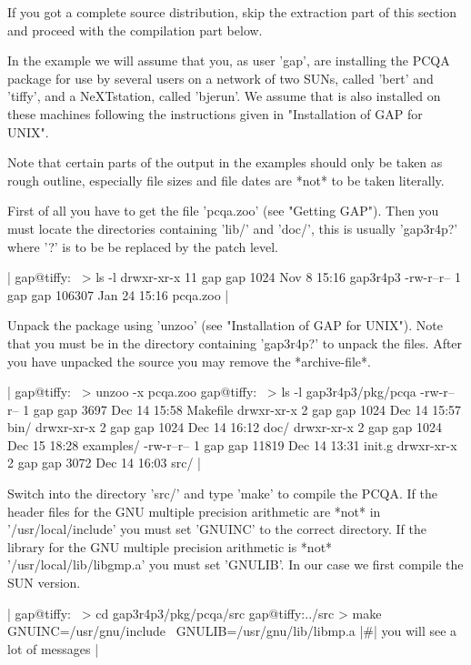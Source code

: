 If you  got a complete source distribution,  skip the  extraction part of
this section and proceed with the compilation part below.

In the example we will assume that you, as user 'gap', are installing the
PCQA  package for use by several  users on a network  of two SUNs, called
'bert' and  'tiffy', and a NeXTstation, called   'bjerun'. We assume that
{\GAP}  is also  installed on these   machines following the instructions
given in "Installation of GAP for UNIX".

Note that certain parts  of  the  output  in the examples should  only be
taken as rough outline, especially file sizes and file dates are *not* to
be taken literally.

First of all you  have to get the  file  'pcqa.zoo' (see "Getting  GAP").
Then you must locate the {\GAP} directories containing 'lib/' and 'doc/',
this is usually 'gap3r4p?' where  '?' is to be  be replaced by the  patch
level.

|    gap@tiffy:~ > ls -l
    drwxr-xr-x  11 gap    gap      1024 Nov  8 15:16 gap3r4p3
    -rw-r--r--   1 gap    gap    106307 Jan 24 15:16 pcqa.zoo |

Unpack the  package using 'unzoo' (see "Installation  of  GAP for UNIX").
Note that you  must be in the  directory containing 'gap3r4p?'  to unpack
the  files.   After  you have  unpacked  the source   you  may remove the
*archive-file*.

|    gap@tiffy:~ > unzoo -x pcqa.zoo
    gap@tiffy:~ > ls -l gap3r4p3/pkg/pcqa
    -rw-r--r--   1 gap    gap      3697 Dec 14 15:58 Makefile
    drwxr-xr-x   2 gap    gap      1024 Dec 14 15:57 bin/
    drwxr-xr-x   2 gap    gap      1024 Dec 14 16:12 doc/
    drwxr-xr-x   2 gap    gap      1024 Dec 15 18:28 examples/
    -rw-r--r--   1 gap    gap     11819 Dec 14 13:31 init.g
    drwxr-xr-x   2 gap    gap      3072 Dec 14 16:03 src/ |

Switch into the directory 'src/' and type 'make' to compile the PCQA.  If
the header files for  the GNU multiple  precision arithmetic are *not* in
'/usr/local/include' you must set 'GNUINC' to  the correct directory.  If
the  library  for the     GNU  multiple  precision arithmetic    is *not*
'/usr/local/lib/libgmp.a'  you must set  'GNULIB'.   In our case we first
compile the SUN version.

|    gap@tiffy:~ > cd gap3r4p3/pkg/pcqa/src
    gap@tiffy:../src > make GNUINC=/usr/gnu/include \
                            GNULIB=/usr/gnu/lib/libmp.a
    |\#| you will see a lot of messages |

